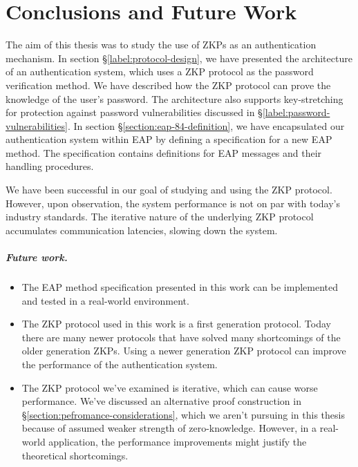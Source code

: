 \chapter{Conclusions and Future Work}
\thispagestyle{fancy}
\label{chapter:4}
The aim of this thesis was to study the use of ZKPs as an authentication mechanism.
In section \S\ref{label:protocol-design}, we have presented the architecture of an authentication system, which uses a ZKP protocol as the password verification method.
We have described how the ZKP protocol can prove the knowledge of the user's password. The architecture also supports key-stretching for protection against password vulnerabilities discussed in \S\ref{label:password-vulnerabilities}.
In section \S\ref{section:eap-84-definition}, we have encapsulated our authentication system within EAP by defining a specification for a new EAP method.
The specification contains definitions for EAP messages and their handling procedures.

We have been successful in our goal of studying and using the ZKP protocol.
However, upon observation, the system performance is not on par with today's industry standards. The iterative nature of the underlying ZKP protocol accumulates communication latencies, slowing down the system.

\paragraph{Future work.}

\begin{itemize}
	\item The EAP method specification presented in this work can be implemented and tested in a real-world environment.
	\item The ZKP protocol used in this work is a first generation protocol. Today there are many newer protocols that have solved many shortcomings of the older generation ZKPs. Using a newer generation ZKP protocol can improve the performance of the authentication system.
	\item The ZKP protocol we've examined is iterative, which can cause worse performance. We've discussed an alternative proof construction in \S\ref{section:pefromance-considerations}, which we aren't pursuing in this thesis because of assumed weaker strength of zero-knowledge. However, in a real-world application, the performance improvements might justify the theoretical shortcomings.
\end{itemize}